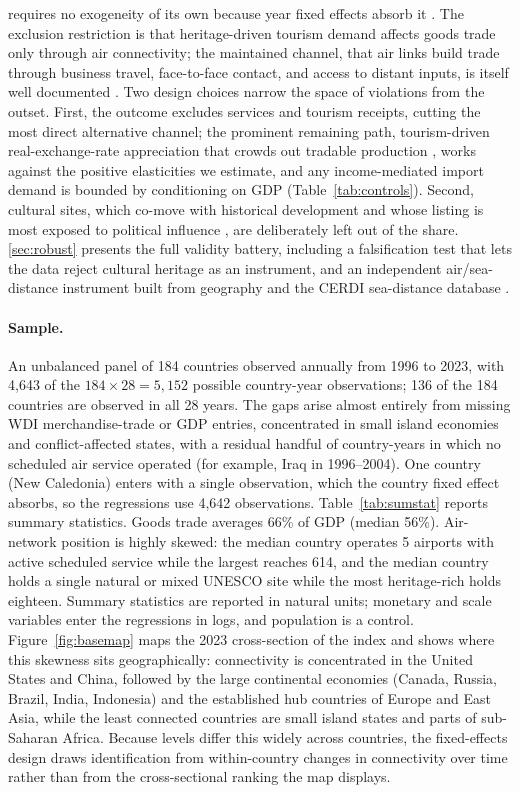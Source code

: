 requires no exogeneity of its own because year fixed effects absorb it
\citep{Borusyak_2022}. The exclusion restriction is that heritage-driven
tourism demand affects goods trade only through air connectivity; the
maintained channel, that air links build trade through business travel,
face-to-face contact, and access to distant inputs, is itself well
documented \citep{Campante_2017,Feyrer_2019}. Two design choices narrow the
space of violations from the outset. First, the outcome excludes services
and tourism receipts, cutting the most direct alternative channel; the
prominent remaining path, tourism-driven real-exchange-rate appreciation
that crowds out tradable production \citep{Copeland_1991,Holzner_2011},
works against the positive elasticities we estimate, and any
income-mediated import demand is bounded by conditioning on GDP
(Table~\ref{tab:controls}). Second, cultural sites, which co-move with
historical development and whose listing is most exposed to political
influence \citep{Bertacchini_2016}, are deliberately left out of the share.
\ref{sec:robust} presents the full validity battery, including a
falsification test that lets the data reject cultural heritage as an
instrument, and an independent air/sea-distance instrument built from
geography and the CERDI sea-distance database \citep{Bertoli_2016}.

\paragraph{Sample.} An unbalanced panel of 184 countries observed annually
from 1996 to 2023, with 4{,}643 of the $184\times28=5{,}152$ possible
country-year observations; 136 of the 184 countries are observed in all 28
years. The gaps arise almost entirely from missing WDI merchandise-trade or
GDP entries, concentrated in small island economies and conflict-affected
states, with a residual handful of country-years in which no scheduled air
service operated (for example, Iraq in 1996--2004). One country (New
Caledonia) enters with a single observation, which the country fixed effect
absorbs, so the regressions use 4{,}642 observations. Table~\ref{tab:sumstat}
reports summary statistics. Goods trade averages 66\% of GDP (median 56\%). Air-network
position is highly skewed: the median country operates 5 airports with active
scheduled service while the largest reaches 614, and the median country holds a
single natural or mixed UNESCO site while the most heritage-rich holds eighteen.
Summary statistics are reported in natural units; monetary and scale variables
enter the regressions in logs, and population is a control.
Figure~\ref{fig:basemap} maps the 2023 cross-section of the index and shows
where this skewness sits geographically: connectivity is concentrated in the
United States and China, followed by the large continental economies (Canada,
Russia, Brazil, India, Indonesia) and the established hub countries of Europe
and East Asia, while the least connected countries are small island states and
parts of sub-Saharan Africa. Because levels differ this widely across
countries, the fixed-effects design draws identification from within-country
changes in connectivity over time rather than from the cross-sectional ranking
the map displays.

